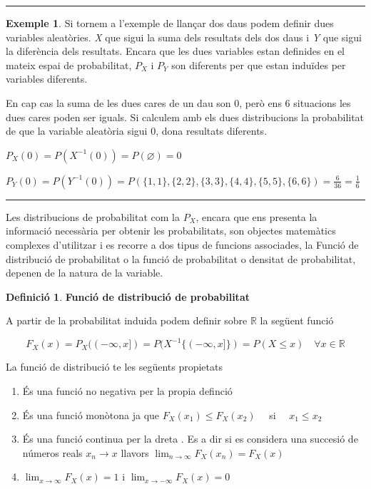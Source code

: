 \documentclass[
  catalan,
]{article}
\providecommand{\tightlist}{%
  \setlength{\itemsep}{0pt}\setlength{\parskip}{0pt}}
\theoremstyle{definition}
\newtheorem{definition}{Definició}[section]
\theoremstyle{definition}
\newtheorem{example}{Exemple}[section]
\theoremstyle{definition}
\theoremstyle{definition}
\theoremstyle{remark}
\begin{document}
\begin{center}\rule{0.5\linewidth}{0.5pt}\end{center}

\begin{example}
Si tornem a l'exemple de llançar dos daus podem definir dues variables aleatòries. \emph{X} que sigui la suma dels resultats dels dos daus i \emph{Y} que sigui la diferència dels resultats. Encara que les dues variables estan definides en el mateix espai de probabilitat, \(P_X\) i \(P_Y\) son diferents per que estan induïdes per variables diferents.

En cap cas la suma de les dues cares de un dau son 0, però ens 6 situacions les dues cares poden ser iguals. Si calculem amb els dues distribucions la probabilitat de que la variable aleatòria sigui 0, dona resultats diferents.

\(P_X(0)=P(X^{-1}(0))=P(\varnothing)=0\)

\(P_Y(0)=P(Y^{-1}(0))=P(\{1,1\},\{2,2\},\{3,3\},\{4,4\},\{5,5\},\{6,6\})=\frac{6}{36}=\frac{1}{6}\)
\end{example}

\begin{center}\rule{0.5\linewidth}{0.5pt}\end{center}

Les distribucions de probabilitat com la \(P_X\), encara que ens presenta la informació necessària per obtenir les probabilitats, son objectes matemàtics complexes d'utilitzar i es recorre a dos tipus de funcions associades, la Funció de distribució de probabilitat o la funció de probabilitat o densitat de probabilitat, depenen de la natura de la variable.

\begin{definition}
\textbf{Funció de distribució de probabilitat}

A partir de la probabilitat induida podem definir sobre \(\mathbb{R}\) la següent funció

\begin{equation}
F_X(x)= P_X((-\infty,x])=P(X^{-1}\{(-\infty,x]\})=P(X\leq x) \quad \forall x \in \mathbb{R} \label{eq:Fx}
\end{equation}
\end{definition}

La funció de distribució te les següents propietats

\begin{enumerate}
\def\labelenumi{\arabic{enumi}.}
\tightlist
\item
  És una funció no negativa per la propia definció
\item
  És una funció monòtona ja que \(F_X(x_1) \leq F_X(x_2) \quad\) si \(\quad x_1 \leq x_2\)
\item
  És una funció continua per la dreta . Es a dir si es considera una succesió de números reals \(x_n \rightarrow x\) llavors \(\lim_{n \rightarrow \infty}F_X(x_n)=F_X (x)\)
\item
  \(\lim_{x \rightarrow \infty} F_X(x)=1\) i \(\lim_{x \rightarrow -\infty} F_X(x)=0\)
\end{enumerate}
\end{document}
